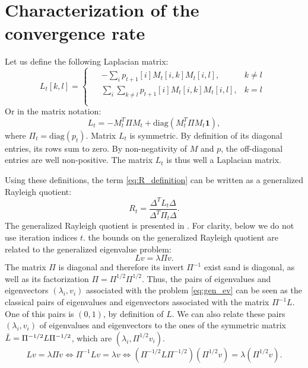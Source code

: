 \documentclass{article}
\begin{document}
\section{Characterization of the convergence rate}
Let us define the following Laplacian matrix:
\begin{equation*}
L_t[k,l]=\begin{cases}
\begin{aligned}
& -\sum_i p_{t+1}[i] M_t[i,k]M_t[i,l], &k \ne l\\
& \sum_i \sum_{k \ne l} p_{t+1}[i] M_t[i,k]M_t[i,l], &k=l\\
\end{aligned}
\end{cases}\end{equation*}
Or in the matrix notation:
\begin{equation*}
L_t = -M_t^T\Pi M_t + \text{diag}(M_t^T\Pi M_t \mathbf{1}),
\end{equation*}
where $\Pi_t = \text{diag}(p_t)$. Matrix $L_t$ is symmetric. By definition of its diagonal entries, its rows sum to zero. By non-negativity of $M$ and $p$, the off-diagonal entries are well non-positive. The matrix $L_t$ is thus well a Laplacian matrix.

Using these definitions, the term \ref{eq:R_definition} can be written as a generalized Rayleigh quotient:
\begin{equation} \label{eq:R_rayleigh}
R_t = \frac{\Delta^T L_t \Delta}{ \Delta^T \Pi_t \Delta}.
\end{equation}
The generalized Rayleigh quotient is presented in \cite{Pattabhiraman_1974}.
For clarity, below we do not use iteration indices $t$. the bounds on the generalized Rayleigh quotient are related to the generalized eigenvalue problem:
\begin{equation} \label{eq:gen_ev}
Lv = \lambda \Pi v.
\end{equation}
The matrix $\Pi$ is diagonal and therefore its invert $\Pi^{-1}$ exist sand is diagonal, as well as its factorization $\Pi=\Pi^{1/2}\Pi^{1/2}$. Thus, the pairs of eigenvalues and eigenvectors $(\lambda_i,v_i)$ associated with the problem \ref{eq:gen_ev} can be seen as the classical pairs of eigenvalues and eigenvectors associated with the matrix $\Pi^{-1}L$. One of this pairs is $(0,1)$, by definition of $L$. We can also relate these pairs $(\lambda_i, v_i)$ of eigenvalues and eigenvectors to the ones of the symmetric matrix $\Tilde{L}=\Pi^{-1/2}L \Pi^{-1/2}$, which are $(\lambda_i,\Pi^{1/2}v_i)$.
\begin{equation*}
Lv = \lambda \Pi v \Leftrightarrow \Pi^{-1}Lv = \lambda v \Leftrightarrow 
(\Pi^{-1/2}L \Pi^{-1/2})(\Pi^{1/2}v) = \lambda (\Pi^{1/2}v).
\end{equation*}
\end{document}
